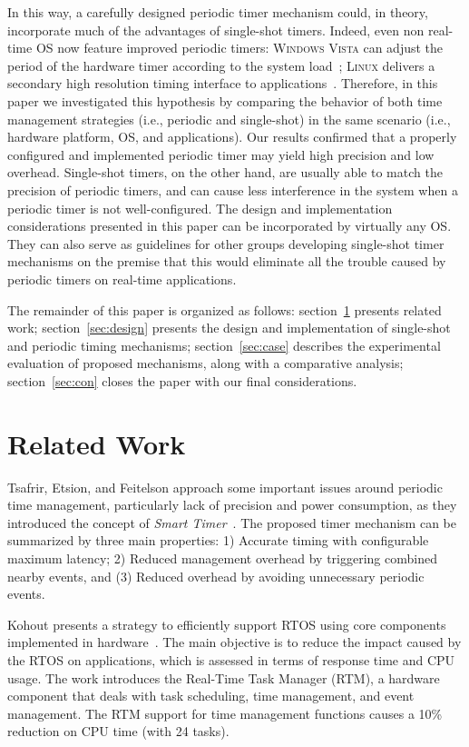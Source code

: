 \documentclass[final,3pd,times]{elsarticle}
\begin{document}
In this way, a carefully designed periodic timer mechanism could, in
theory, incorporate much of the advantages of single-shot timers.
Indeed, even non real-time OS now feature improved periodic timers:
\textsc{Windows Vista} can adjust the period of the hardware timer
according to the system load~\cite{Peter:2008}; \textsc{Linux} delivers
a secondary high resolution timing interface to
applications~\cite{Siddha:2007}.  Therefore, in this paper we
investigated this hypothesis by comparing the behavior of both time
management strategies (i.e., periodic and single-shot) in the same
scenario (i.e., hardware platform, OS, and applications). Our results
confirmed that a properly configured and implemented periodic timer may
yield high precision and low overhead.  Single-shot timers, on the other
hand, are usually able to match the precision of periodic timers, and
can cause less interference in the system when a periodic timer is not
well-configured. The design and implementation considerations presented
in this paper can be incorporated by virtually any OS. They can also
serve as guidelines for other groups developing single-shot timer
mechanisms on the premise that this would eliminate all the trouble
caused by periodic timers on real-time applications.

The remainder of this paper is organized as follows:
section~\ref{sec:rel} presents related work; section~\ref{sec:design}
presents the design and implementation of single-shot and periodic
timing mechanisms; section~\ref{sec:case} describes the experimental
evaluation of proposed mechanisms, along with a comparative analysis;
section~\ref{sec:con} closes the paper with our final considerations.

\section{Related Work}\label{sec:rel}

Tsafrir, Etsion, and Feitelson approach some important issues around
periodic time management, particularly lack of precision and power
consumption, as they introduced the concept of \emph{Smart
  Timer}~\cite{Tsafrir:2005}. The proposed timer mechanism can be
summarized by three main properties: 1) Accurate timing with configurable
maximum latency; 2) Reduced management overhead by triggering combined
nearby events, and (3) Reduced overhead by avoiding unnecessary periodic
events.

Kohout presents a strategy to efficiently support RTOS using core
components implemented in hardware~\cite{Kohout:2003}. The main
objective is to reduce the impact caused by the RTOS on applications,
which is assessed in terms of response time and CPU usage. The work
introduces the Real-Time Task Manager (RTM), a hardware component that
deals with task scheduling, time management, and event management. The
RTM support for time management functions causes a 10\% reduction on CPU
time (with 24 tasks).
\end{document}
